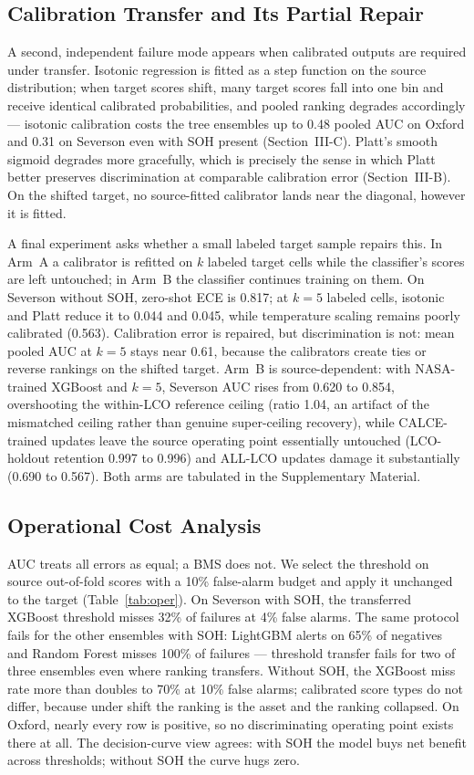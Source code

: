 \documentclass[11pt,a4paper]{article}
\begin{document}
\subsection{Calibration Transfer and Its Partial Repair}
A second, independent failure mode appears when calibrated outputs are required under transfer. Isotonic regression is fitted as a step function on the source distribution; when target scores shift, many target scores fall into one bin and receive identical calibrated probabilities, and pooled ranking degrades accordingly --- isotonic calibration costs the tree ensembles up to 0.48 pooled AUC on Oxford and 0.31 on Severson even with SOH present (Section~III-C). Platt's smooth sigmoid degrades more gracefully, which is precisely the sense in which Platt better preserves discrimination at comparable calibration error (Section~III-B). On the shifted target, no source-fitted calibrator lands near the diagonal, however it is fitted.

A final experiment asks whether a small labeled target sample repairs this. In Arm~A a calibrator is refitted on $k$ labeled target cells while the classifier's scores are left untouched; in Arm~B the classifier continues training on them. On Severson without SOH, zero-shot ECE is 0.817; at $k{=}5$ labeled cells, isotonic and Platt reduce it to 0.044 and 0.045, while temperature scaling remains poorly calibrated (0.563). Calibration error is repaired, but discrimination is not: mean pooled AUC at $k{=}5$ stays near 0.61, because the calibrators create ties or reverse rankings on the shifted target. Arm~B is source-dependent: with NASA-trained XGBoost and $k{=}5$, Severson AUC rises from 0.620 to 0.854, overshooting the within-LCO reference ceiling (ratio 1.04, an artifact of the mismatched ceiling rather than genuine super-ceiling recovery), while CALCE-trained updates leave the source operating point essentially untouched (LCO-holdout retention 0.997 to 0.996) and ALL-LCO updates damage it substantially (0.690 to 0.567). Both arms are tabulated in the Supplementary Material.

\subsection{Operational Cost Analysis}
AUC treats all errors as equal; a BMS does not. We select the threshold on source out-of-fold scores with a 10\% false-alarm budget and apply it unchanged to the target (Table~\ref{tab:oper}). On Severson with SOH, the transferred XGBoost threshold misses 32\% of failures at 4\% false alarms. The same protocol fails for the other ensembles with SOH: LightGBM alerts on 65\% of negatives and Random Forest misses 100\% of failures --- threshold transfer fails for two of three ensembles even where ranking transfers. Without SOH, the XGBoost miss rate more than doubles to 70\% at 10\% false alarms; calibrated score types do not differ, because under shift the ranking is the asset and the ranking collapsed. On Oxford, nearly every row is positive, so no discriminating operating point exists there at all. The decision-curve view agrees: with SOH the model buys net benefit across thresholds; without SOH the curve hugs zero.
\end{document}
